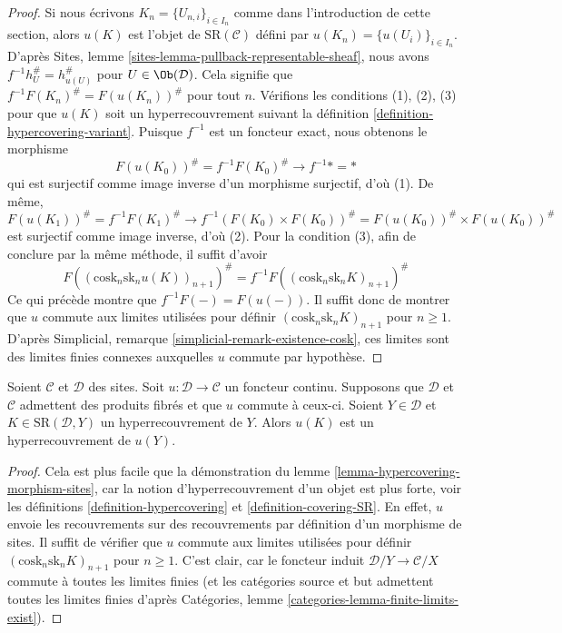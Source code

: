 \begin{proof}
Si nous écrivons $K_n = \{U_{n, i}\}_{i \in I_n}$ comme dans l'introduction
de cette section, alors $u(K)$ est l'objet de $\text{SR}(\mathcal{C})$
défini par $u(K_n) = \{u(U_i)\}_{i \in I_n}$.
D'après Sites, lemme \ref{sites-lemma-pullback-representable-sheaf},
nous avons $f^{-1}h_U^\# = h_{u(U)}^\#$ pour $U \in \Ob(\mathcal{D})$.
Cela signifie que $f^{-1}F(K_n)^\# = F(u(K_n))^\#$ pour tout $n$.
Vérifions les conditions (1), (2), (3) pour que $u(K)$ soit un
hyperrecouvrement suivant la définition \ref{definition-hypercovering-variant}.
Puisque $f^{-1}$ est un foncteur exact, nous obtenons le morphisme
$$
F(u(K_0))^\# = f^{-1}F(K_0)^\# \to f^{-1}* = *
$$
qui est surjectif comme image inverse d'un morphisme surjectif, d'où (1).
De même,
$$
F(u(K_1))^\# = f^{-1}F(K_1)^\# \to
f^{-1} (F(K_0) \times F(K_0))^\# = F(u(K_0))^\# \times F(u(K_0))^\#
$$
est surjectif comme image inverse, d'où (2). Pour la condition (3),
afin de conclure par la même méthode, il suffit d'avoir
$$
F((\text{cosk}_n \text{sk}_n u(K))_{n + 1})^\# =
f^{-1}F((\text{cosk}_n \text{sk}_n K)_{n + 1})^\#
$$
Ce qui précède montre que $f^{-1}F(-) = F(u(-))$. Il suffit donc de montrer
que $u$ commute aux limites utilisées pour définir
$(\text{cosk}_n \text{sk}_n K)_{n + 1}$ pour $n \geq 1$.
D'après Simplicial, remarque \ref{simplicial-remark-existence-cosk},
ces limites sont des limites finies connexes auxquelles $u$ commute
par hypothèse.
\end{proof}

\begin{lemma}
\label{lemma-hypercovering-continuous-functor}
Soient $\mathcal{C}$ et $\mathcal{D}$ des sites. Soit
$u : \mathcal{D} \to \mathcal{C}$ un foncteur continu.
Supposons que $\mathcal{D}$ et $\mathcal{C}$ admettent des produits fibrés
et que $u$ commute à ceux-ci. Soient $Y \in \mathcal{D}$ et
$K \in \text{SR}(\mathcal{D}, Y)$ un hyperrecouvrement de $Y$.
Alors $u(K)$ est un hyperrecouvrement de $u(Y)$.
\end{lemma}

\begin{proof}
Cela est plus facile que la démonstration du lemme \ref{lemma-hypercovering-morphism-sites},
car la notion d'hyperrecouvrement d'un objet est plus forte, voir les
définitions \ref{definition-hypercovering} et \ref{definition-covering-SR}.
En effet, $u$ envoie les recouvrements sur des recouvrements par définition
d'un morphisme de sites. Il suffit de vérifier que $u$ commute aux
limites utilisées pour définir
$(\text{cosk}_n \text{sk}_n K)_{n + 1}$ pour $n \geq 1$.
C'est clair, car le foncteur induit
$\mathcal{D}/Y \to \mathcal{C}/X$ commute à toutes les limites finies
(et les catégories source et but admettent toutes les limites finies d'après
Catégories, lemme \ref{categories-lemma-finite-limits-exist}).
\end{proof}

